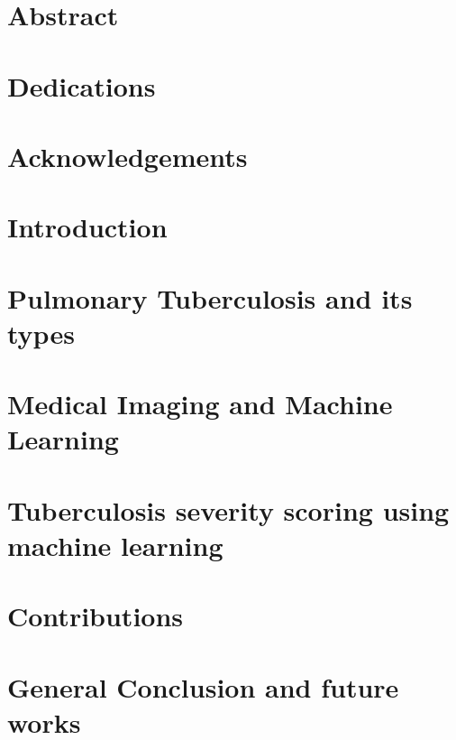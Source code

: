 \documentclass[12pt]{report}
\begin{document}
\chapter*{Abstract}

\chapter*{Dedications}

\chapter*{Acknowledgements}

\tableofcontents
\newpage    
\listoffigures
\listoftables
\printacronyms[include-classes=abbrev,name=Abbreviations]
\chapter*{Introduction}

\chapter{Pulmonary Tuberculosis and its types}

\chapter{Medical Imaging and Machine Learning}

\chapter{Tuberculosis severity scoring using machine learning}

\chapter{Contributions}

\chapter*{General Conclusion  and future works}

\newpage
\newpage
 

\end{document}
